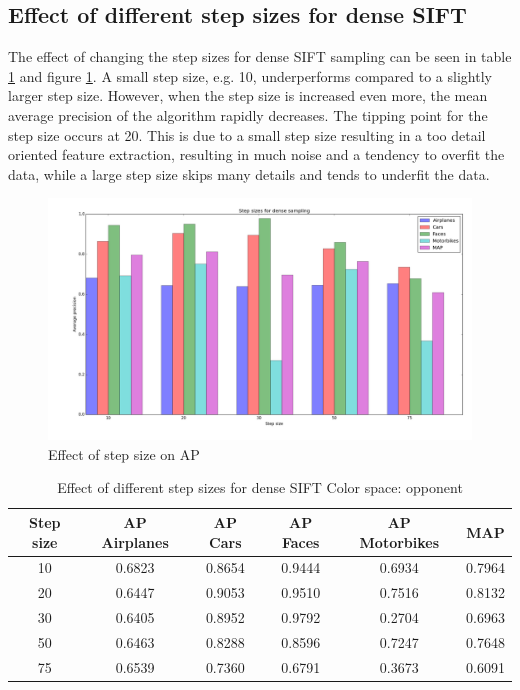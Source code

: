 \subsection{Effect of different step sizes for dense SIFT}
The effect of changing the step sizes for dense SIFT sampling can be seen in table \ref{tab:stepsize} and figure \ref{plot:stepsize}. A small step size, e.g. 10, underperforms compared to a slightly larger step size. However, when the step size is increased even more, the mean average precision of the algorithm rapidly decreases. The tipping point for the step size occurs at 20. This is due to a small step size resulting in a too detail oriented feature extraction, resulting in much noise and a tendency to overfit the data, while a large step size skips many details and tends to underfit the data. 

\begin{figure}[H]
\includegraphics[width=\textwidth]{../plots/step_sizes_dense_sampling}
\caption{Effect of step size on AP}
\label{plot:stepsize}
\end{figure}
\begin{table}[H]
\begin{tabular}{|c|ccccc|}
\hline
\textbf{Step size} & \textbf{AP Airplanes} & \textbf{AP Cars} & \textbf{AP Faces} & \textbf{AP Motorbikes} & \textbf{MAP}\\
\hline
10 & 0.6823 & 0.8654 & 0.9444 & 0.6934 & 0.7964\\
20 & 0.6447 & 0.9053 & 0.9510 & 0.7516 & 0.8132\\
30 & 0.6405 &  0.8952& 0.9792& 0.2704 & 0.6963\\
50 & 0.6463 & 0.8288 & 0.8596 & 0.7247 & 0.7648\\
75 & 0.6539 & 0.7360 & 0.6791 & 0.3673 & 0.6091\\
\hline
\end{tabular}
\caption{Effect of different step sizes for dense SIFT Color space: opponent}
\label{tab:stepsize}
\end{table}